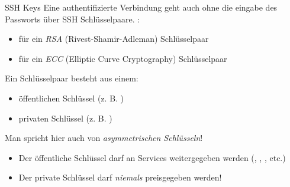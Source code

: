 \documentclass{setbeamer}
\begin{document}
\begin{frame}{SSH Keys}
    Eine authentifizierte Verbindung geht auch ohne die eingabe des Passworts über SSH Schlüsselpaare. :
    \begin{itemize}
        \item {} für ein \emph{RSA} (Rivest-Shamir-Adleman) Schlüsselpaar
        \item {} für ein \emph{ECC} (Elliptic Curve Cryptography) Schlüsselpaar
    \end{itemize}

    \vspace{0.3cm}

    Ein Schlüsselpaar besteht aus einem:
    \begin{itemize}
        \item öffentlichen Schlüssel (z. B. )
        \item privaten Schlüssel (z. B. )
    \end{itemize}
    {\Large \MVRightarrow} Man spricht hier auch von \emph{asymmetrischen Schlüsseln}!

    \vspace{0.3cm}

    \begin{itemize}
        \item Der öffentliche Schlüssel darf an Services weitergegeben werden (, , , etc.)
        \item Der private Schlüssel darf \emph{niemals} preisgegeben werden!
    \end{itemize}
\end{frame}

\end{document}
